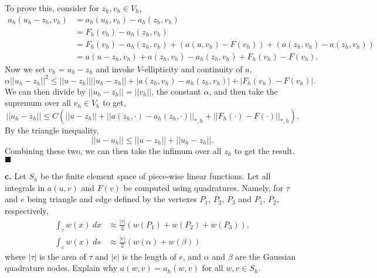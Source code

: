 \documentclass[11pt]{article}
\begin{document}
To prove this, consider for $z_h, v_h \in V_h$,
\begin{align*}
    a_h(u_h - z_h, v_h) &= a_h(u_h, v_h) - a_h(z_h, v_h) \\
    &= F_h(v_h) - a_h(z_h, v_h) \\
    &= F_h(v_h) - a_h(z_h, v_h) + (a(u,v_h) - F(v_h)) + (a(z_h, v_h) - a(z_h, v_h)) \\
    &= a(u - z_h, v_h) + a(z_h, v_h) - a_h(z_h, v_h) + F_h(v_h) - F(v_h).
\end{align*}
Now we set $v_h = u_h - z_h$ and invoke $V$-ellipticity and continuity of $a$,
\begin{equation*}
    \alpha ||u_h - z_h||^2 \leq ||u - z_h|| ||u_h - z_h|| + |a(z_h, v_h) - a_h(z_h, v_h)| + |F_h(v_h) - F(v_h)|.
\end{equation*}
We can then divide by $||u_h - z_h|| = ||v_h||$, the constant $\alpha$, and then take the supremum over all $v_h \in V_h$ to get,
\begin{equation*}
    ||u_h - z_h|| \leq C ( ||u - z_h|| + ||a(z_h, \cdot) - a_h(z_h, \cdot)||_{*,h} + ||F_h(\cdot) - F(\cdot)||_{*,h}).
\end{equation*}
By the triangle inequality,
\begin{equation*}
    ||u - u_h|| \leq ||u - z_h|| + ||u_h - z_h||.
\end{equation*}
Combining these two, we can then take the infimum over all $z_h$ to get the result.
$\blacksquare$



\vskip 2cm

\textbf{c.}  Let $S_h$ be the finite element space of piece-wise linear functions.
Let all integrals in $a(u, v)$ and $F(v)$ be computed using quadratures. 
Namely, for $\tau$ and $e$ being triangle and edge defined by the vertexes $P_1$, $P_2$, $P_3$ and $P_1$, $P_2$, respectively,
\begin{align}
    \int_\tau w(x) \: dx &\approx \frac{|\tau|}{3}(w(P_1) + w(P_2) + w(P_3)), \\
    \int_e w(x) \: ds &\approx \frac{|e|}{2}(w(\alpha) + w(\beta))
\end{align}
where $|\tau|$ is the area of $\tau$ and $|e|$ is the length of $e$, and $\alpha$ and $\beta$ are the Gaussian quadrature nodes.
Explain why $a(w, v) = a_h(w, v)$ for all $w, v \in S_h$.

\vskip 1cm
\end{document}
